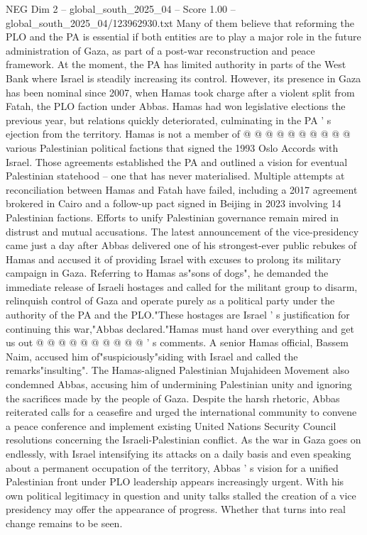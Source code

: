 \begin{textsample}{NEG Dim 2 – global\_south\_2025\_04 – Score 1.00 – global\_south\_2025\_04/123962930.txt}
Many of them believe that reforming the PLO and the PA is essential if both entities are to play a major role in the future administration of Gaza, as part of a post-war reconstruction and peace framework.
At the moment, the PA has limited authority in parts of the West Bank where Israel is steadily increasing its control.
However, its presence in Gaza has been nominal since 2007, when Hamas took charge after a violent split from Fatah, the PLO faction under Abbas.
Hamas had won legislative elections the previous year, but relations quickly deteriorated, culminating in the PA ' s ejection from the territory.
Hamas is not a member of @ @ @ @ @ @ @ @ @ @ various Palestinian political factions that signed the 1993 Oslo Accords with Israel.
Those agreements established the PA and outlined a vision for eventual Palestinian statehood -- one that has never materialised.
Multiple attempts at reconciliation between Hamas and Fatah have failed, including a 2017 agreement brokered in Cairo and a follow-up pact signed in Beijing in 2023 involving 14 Palestinian factions.
Efforts to unify Palestinian governance remain mired in distrust and mutual accusations.
The latest announcement of the vice-presidency came just a day after Abbas delivered one of his strongest-ever public rebukes of Hamas and accused it of providing Israel with excuses to prolong its military campaign in Gaza.
Referring to Hamas as"sons of dogs", he demanded the immediate release of Israeli hostages and called for the militant group to disarm, relinquish control of Gaza and operate purely as a political party under the authority of the PA and the PLO."These hostages are Israel ' s justification for continuing this war,"Abbas declared."Hamas must hand over everything and get us out @ @ @ @ @ @ @ @ @ @ ' s comments.
A senior Hamas official, Bassem Naim, accused him of"suspiciously"siding with Israel and called the remarks"insulting".
The Hamas-aligned Palestinian Mujahideen Movement also condemned Abbas, accusing him of undermining Palestinian unity and ignoring the sacrifices made by the people of Gaza.
Despite the harsh rhetoric, Abbas reiterated calls for a ceasefire and urged the international community to convene a peace conference and implement existing United Nations Security Council resolutions concerning the Israeli-Palestinian conflict.
As the war in Gaza goes on endlessly, with Israel intensifying its attacks on a daily basis and even speaking about a permanent occupation of the territory, Abbas ' s vision for a unified Palestinian front under PLO leadership appears increasingly urgent.
With his own political legitimacy in question and unity talks stalled the creation of a vice presidency may offer the appearance of progress.
Whether that turns into real change remains to be seen.

\end{textsample}
